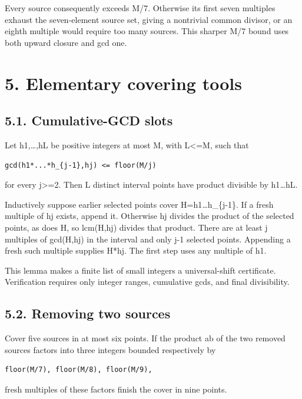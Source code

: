 \documentclass[11pt,a4paper]{article}
\begin{document}
Every source consequently exceeds M/7. Otherwise its first seven
multiples exhaust the seven-element source set, giving a nontrivial
common divisor, or an eighth multiple would require too many sources.
This sharper M/7 bound uses both upward closure and gcd one.

\section{5. Elementary covering tools}\label{elementary-covering-tools}

\subsection{5.1. Cumulative-GCD slots}\label{cumulative-gcd-slots}

Let h1,\ldots,hL be positive integers at most M, with L\textless=M, such
that

\begin{verbatim}
gcd(h1*...*h_{j-1},hj) <= floor(M/j)
\end{verbatim}

for every j\textgreater=2. Then L distinct interval points have product
divisible by h1\emph{\ldots{}}hL.

Inductively suppose earlier selected points cover
H=h1\emph{\ldots{}}h\_\{j-1\}. If a fresh multiple of hj exists, append
it. Otherwise hj divides the product of the selected points, as does H,
so lcm(H,hj) divides that product. There are at least j multiples of
gcd(H,hj) in the interval and only j-1 selected points. Appending a
fresh such multiple supplies H*hj. The first step uses any multiple of
h1.

This lemma makes a finite list of small integers a universal-shift
certificate. Verification requires only integer ranges, cumulative gcds,
and final divisibility.

\subsection{5.2. Removing two sources}\label{removing-two-sources}

Cover five sources in at most six points. If the product ab of the two
removed sources factors into three integers bounded respectively by

\begin{verbatim}
floor(M/7), floor(M/8), floor(M/9),
\end{verbatim}

fresh multiples of these factors finish the cover in nine points.
\end{document}
